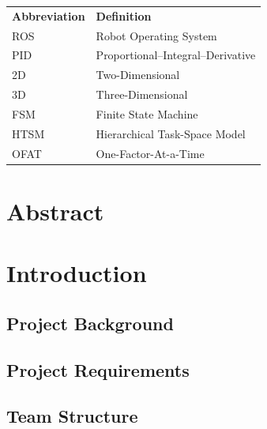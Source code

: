 \documentclass[12pt, a4paper]{report}
\begin{document}
\begin{tabular}{@{}ll@{}}
  \textbf{Abbreviation} & \textbf{Definition} \\[4pt]
  ROS   & Robot Operating System \\
  PID   & Proportional--Integral--Derivative \\
  2D    & Two-Dimensional \\
  3D    & Three-Dimensional \\
  FSM   & Finite State Machine \\
  HTSM  & Hierarchical Task-Space Model \\
  OFAT  & One-Factor-At-a-Time \\
\end{tabular}

\newpage
{}

\chapter{Abstract}


\chapter{Introduction}

\section{Project Background}


\section{Project Requirements}


\section{Team Structure}
\end{document}
